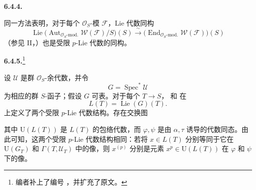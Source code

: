 \medskip
\noindent\textbf{6.4.4.}
\label{sga3:VIIA:6.4.4}

同一方法表明，对于每个 \(\mathcal O_S\)-模 \(\mathcal F\)，Lie 代数同构
\[
  \operatorname{Lie}
  \bigl(
    \operatorname{Aut}_{\mathcal O_S\text{-mod.}}
    \mathcal W(\mathcal F)/S
  \bigr)(S)
  \xrightarrow{\ \sim\ }
  \bigl(
    \operatorname{End}_{\mathcal O_S\text{-mod.}}
    \mathcal W(\mathcal F)
  \bigr)(S)
\]
（参见 II，）也是受限 \(p\)-Lie 代数的同构。

\medskip
\noindent\textbf{6.4.5.}\footnote{编者补上了编号 ，并扩充了原文。}
\label{sga3:VIIA:6.4.5}

设 \(\mathcal U\) 是群 \(\mathcal O_S\)-余代数，并令
\[
  G=\operatorname{Spec}^{*}\mathcal U
\]
为相应的群 \(S\)-函子；假设 \(G\) 可表。对于每个 \(T\to S\)， 和  在
\[
  L(T)=\operatorname{Lie}(G)(T).
\]
上定义了两个受限 \(p\)-Lie 代数结构。存在交换图
\begin{center}
  \label{sga3:VIIA:6.4.5-group-coalgebra-comparison}
  
\end{center}
其中 \(\mathrm U(L(T))\) 是 \(L(T)\) 的包络代数，而 \(\varphi,\psi\) 是由 \(\alpha,\tau\) 诱导的代数同态。由此可知，这两个受限 \(p\)-Lie 代数结构相同：若将 \(x\in L(T)\) 分别等同于它在 \(\mathrm U(G_T)\) 和 \(\Gamma(T,\mathcal U_T)\) 中的像，则 \(x^{(p)}\) 分别是元素 \(x^p\in\mathrm U(L(T))\) 在 \(\varphi\) 和 \(\psi\) 下的像。

